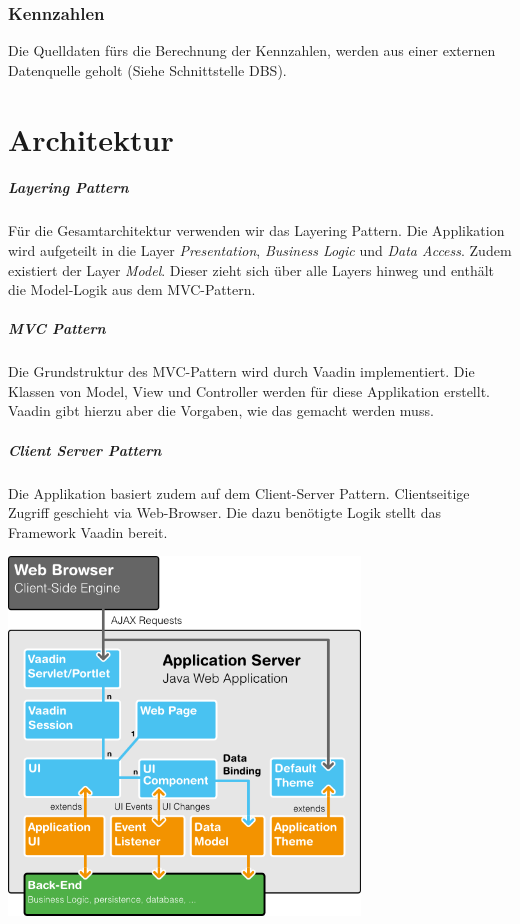 \documentclass[a4paper]{scrreprt}
\begin{document}
\subsection{Kennzahlen}
Die Quelldaten fürs die Berechnung der Kennzahlen, werden aus einer externen Datenquelle geholt (Siehe Schnittstelle DBS).






\chapter{Architektur}
\paragraph{Layering Pattern}
Für die Gesamtarchitektur verwenden wir das Layering Pattern. Die Applikation wird aufgeteilt in die Layer \textit{Presentation}, \textit{Business Logic} und \textit{Data Access}. Zudem existiert der Layer \textit{Model}. Dieser zieht sich über alle Layers hinweg und enthält die Model-Logik aus dem MVC-Pattern.


\paragraph{MVC Pattern}
Die Grundstruktur des MVC-Pattern wird durch Vaadin implementiert. Die Klassen von Model, View und Controller werden für diese Applikation erstellt. Vaadin gibt hierzu aber die Vorgaben, wie das gemacht werden muss.


\paragraph{Client Server Pattern}
Die Applikation basiert zudem auf dem Client-Server Pattern. Clientseitige Zugriff geschieht via Web-Browser. Die dazu benötigte Logik stellt das Framework Vaadin bereit.

\bigskip

\includegraphics[width=0.7\textwidth]{img/vaadin-arch.png}
\end{document}
